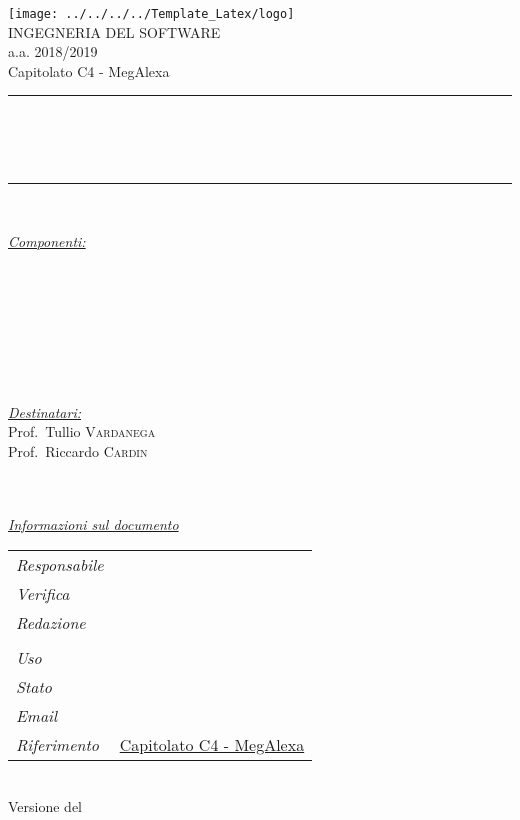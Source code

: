 \begin{titlepage}
\begin{center}
\texttt{[image: ../../../../Template\_Latex/logo]}\\
{\large INGEGNERIA DEL SOFTWARE \\ a.a. 2018/2019}\\[0.5cm]
{\large Capitolato C4 - MegAlexa}\\
\rule{\linewidth}{0.5mm} \\[0.4cm]
{ \huge \bfseries \thetitle{} \usage \\ \thedate \\[0.4cm] } %
\rule{\linewidth}{0.5mm} \\[1.cm]
\noindent
\begin{minipage}{0.4\textwidth}
	\begin{flushleft} \large
		\underline{\emph{Componenti:}}\\[0.2cm]
		\sonia\\
		\alberto \\
		\andrea  \\
		\alessandro \\
		\matteo  \\ 
		\pardeep \\  
		\luca \\
	\end{flushleft}
\end{minipage}
\begin{minipage}{0.4\textwidth}
  \begin{flushright} \large
    \underline{\emph{Destinatari:}} \\[0.2cm]
    Prof.~Tullio \textsc{Vardanega}\\
    Prof.\hspace{0.31cm}~Riccardo \textsc{Cardin}\\
    \proposer\\
  \end{flushright}
\end{minipage}\\[0.8cm]

\underline{\emph{Informazioni sul documento}} \\[0.2cm]
\begin{tabular}{ll}
	\emph{Responsabile} & \resp \\
	\emph{Verifica} & \verif \\
	\emph{Redazione} & \editorfrow \\
					 & \editorsrow \\  
	\emph{Uso} & \usage\\
	\emph{Stato} & \status\\
	\emph{Email} & \href{mailto:\groupEmail} {\groupEmail}\\
	\emph{Riferimento} & \href{https://www.math.unipd.it/~tullio/IS-1/2018/Progetto/C4.pdf}{Capitolato C4 - MegAlexa}
\end{tabular}
	\\[1.5cm]
\vfill
{\large Versione \theversion{} del\\ \thedatelast} %
\end{center}
\end{titlepage}
